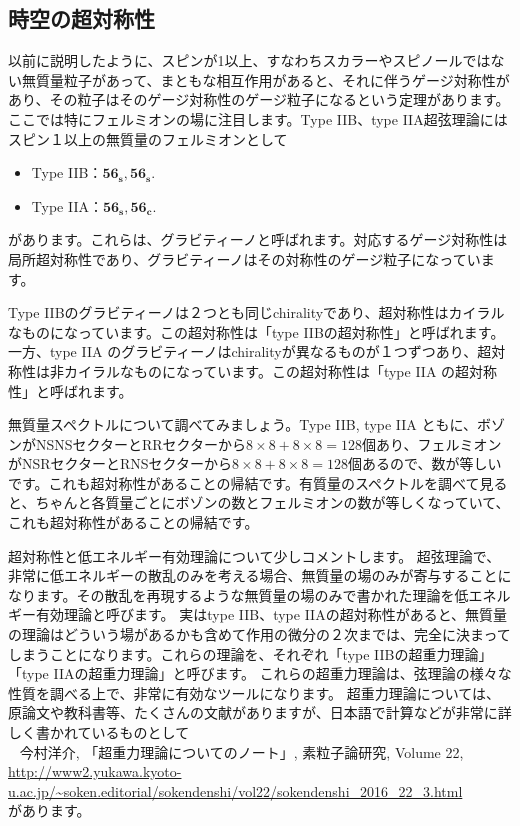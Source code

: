 \documentclass[report,paper=a4, fontsize=12pt, line_length=16cm, number_of_lines=34,dvipdfmx]{jlreq}
\newenvironment{mycite}{\\ \qquad \textbullet\ }{\\}
\numberwithin{equation}{chapter}
\numberwithin{equation}{section}
\newcommand{\fsxs}{\mathbf{56_s}}
\newcommand{\fsxc}{\mathbf{56_c}}
\begin{document}
\subsection{時空の超対称性}
以前に説明したように、スピンが1以上、すなわちスカラーやスピノールではない無質量粒子があって、まともな相互作用があると、それに伴うゲージ対称性があり、その粒子はそのゲージ対称性のゲージ粒子になるという定理があります。ここでは特にフェルミオンの場に注目します。Type IIB、type IIA超弦理論にはスピン１以上の無質量のフェルミオンとして
\begin{itemize}
  \item Type IIB：$\fsxs,\fsxs$.
  \item Type IIA：$\fsxs,\fsxc$.
\end{itemize}
があります。これらは、グラビティーノと呼ばれます。対応するゲージ対称性は局所超対称性であり、グラビティーノはその対称性のゲージ粒子になっています。

Type IIBのグラビティーノは２つとも同じchiralityであり、超対称性はカイラルなものになっています。この超対称性は「type IIBの超対称性」と呼ばれます。一方、type IIA のグラビティーノはchiralityが異なるものが１つずつあり、超対称性は非カイラルなものになっています。この超対称性は「type IIA の超対称性」と呼ばれます。

無質量スペクトルについて調べてみましょう。Type IIB, type IIA ともに、ボゾンがNSNSセクターとRRセクターから$8\times 8+8\times 8=128$個あり、フェルミオンがNSRセクターとRNSセクターから$8\times 8+8\times 8=128$個あるので、数が等しいです。これも超対称性があることの帰結です。有質量のスペクトルを調べて見ると、ちゃんと各質量ごとにボゾンの数とフェルミオンの数が等しくなっていて、これも超対称性があることの帰結です。

超対称性と低エネルギー有効理論について少しコメントします。
超弦理論で、非常に低エネルギーの散乱のみを考える場合、無質量の場のみが寄与することになります。その散乱を再現するような無質量の場のみで書かれた理論を低エネルギー有効理論と呼びます。
実はtype IIB、type IIAの超対称性があると、無質量の理論はどういう場があるかも含めて作用の微分の２次までは、完全に決まってしまうことになります。これらの理論を、それぞれ「type IIBの超重力理論」「type IIAの超重力理論」と呼びます。
これらの超重力理論は、弦理論の様々な性質を調べる上で、非常に有効なツールになります。
超重力理論については、原論文や教科書等、たくさんの文献がありますが、日本語で計算などが非常に詳しく書かれているものとして
\begin{mycite}
  今村洋介, 「超重力理論についてのノート」, 素粒子論研究, Volume 22, \url{http://www2.yukawa.kyoto-u.ac.jp/~soken.editorial/sokendenshi/vol22/sokendenshi_2016_22_3.html}
\end{mycite}
があります。
\end{document}
